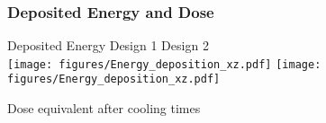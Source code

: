\documentclass[xcolor={dvipsnames}]{beamer}
\begin{document}
\subsubsection{Deposited Energy and Dose}
\begin{frame}{Deposited Energy}
\centering
\hspace*{1.6cm} Design 1 \hfill Design 2 \hspace*{1.8cm} \\
  \texttt{[image: figures/Energy\_deposition\_xz.pdf]}
    \texttt{[image: figures/Energy\_deposition\_xz.pdf]}
\end{frame}
\begin{frame}{Dose equivalent after cooling times}
  \begin{center}
  \end{center}
\end{frame}
\end{document}

